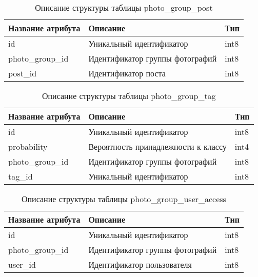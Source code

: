 \begin{table}[H]
  \caption{\onehalfspacing Описание структуры таблицы photo_group_post}\label{database-table-photo-group-post}
  \begin{tabular}{|p{6cm}|p{6cm}|p{4cm}|}
  \hline Название атрибута & Описание & Тип \\
  \hline id & Уникальный идентификатор & int8 \\
  \hline photo_group_id & Идентификатор группы фотографий & int8 \\
  \hline post_id & Идентификатор поста & int8 \\
  \hline 
  \end{tabular}
\end{table}

\begin{table}[H]
  \caption{\onehalfspacing Описание структуры таблицы photo_group_tag}\label{database-table-photo-group-tag}
  \begin{tabular}{|p{6cm}|p{6cm}|p{4cm}|}
  \hline Название атрибута & Описание & Тип \\
  \hline id & Уникальный идентификатор & int8 \\
  \hline probability & Вероятность принадлежности к классу & int4 \\
  \hline photo_group_id & Идентификатор группы фотографий & int8 \\
  \hline tag_id & Уникальный идентификатор & int8 \\
  \hline
  \end{tabular}
\end{table}

\begin{table}[H]
  \caption{\onehalfspacing Описание структуры таблицы photo_group_user_access}\label{database-table-photo-group-user-access}
  \begin{tabular}{|p{6cm}|p{6cm}|p{4cm}|}
  \hline Название атрибута & Описание & Тип \\
  \hline id & Уникальный идентификатор & int8 \\
  \hline photo_group_id & Идентификатор группы фотографий & int8 \\
  \hline user_id & Идентификатор пользователя & int8 \\
  \hline 
  \end{tabular}
\end{table}

